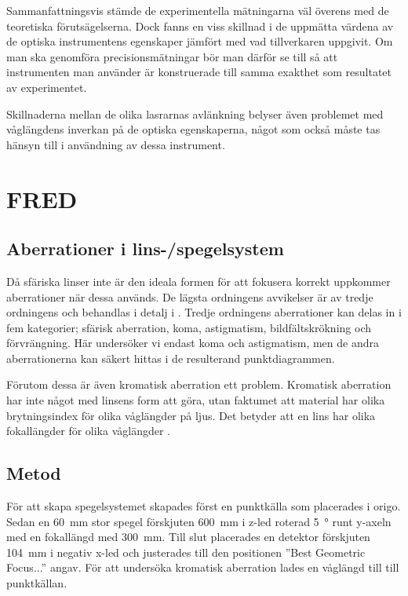 \documentclass[a4paper]{article}
\begin{document}
  Sammanfattningsvis stämde de experimentella mätningarna väl överens med de teoretiska förutsägelserna. Dock fanns en viss skillnad i de uppmätta värdena av de optiska instrumentens egenskaper jämfört med vad tillverkaren uppgivit. Om man ska genomföra precisionsmätningar bör man därför se till så att instrumenten man använder är konstruerade till samma exakthet som resultatet av experimentet.
  
  Skillnaderna mellan de olika lasrarnas avlänkning belyser även problemet med våglängdens inverkan på de optiska egenskaperna, något som också måste tas hänsyn till i användning av dessa instrument.

\section{FRED}


\subsection{Aberrationer i lins-/spegelsystem}

Då sfäriska linser inte är den ideala formen för att fokusera korrekt uppkommer aberrationer när dessa används. De lägsta ordningens avvikelser är av tredje ordningens och behandlas i detalj i \cite[Kapitel~20]{pearsonIntroOpt}. Tredje ordningens aberrationer kan delas in i fem kategorier; sfärisk aberration, koma, astigmatism, bildfältskrökning och förvrängning. Här undersöker vi endast koma och astigmatism, men de andra aberrationerna kan säkert hittas i de resulterand punktdiagrammen.

Förutom dessa är även kromatisk aberration ett problem. Kromatisk aberration har inte något med linsens form att göra, utan faktumet att material har olika brytningsindex för olika våglängder på ljus. Det betyder att en lins har olika fokallängder för olika våglängder \cite[Kapitel~20]{pearsonIntroOpt}.

\subsection{Metod}

För att skapa spegelsystemet skapades först en punktkälla som placerades i origo. Sedan en \SI{60}{\milli\meter} stor spegel förskjuten \SI{600}{\milli\meter} i z-led roterad \SI{5}{\degree} runt y-axeln med en fokallängd med \SI{300}{\milli\meter}. Till slut placerades en detektor förskjuten \SI{104}{\milli\meter} i negativ x-led och justerades till den positionen ”Best Geometric Focus...” angav. För att undersöka kromatisk aberration lades en våglängd till till punktkällan.
\end{document}
